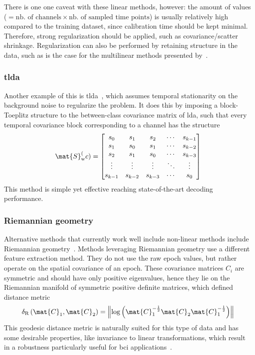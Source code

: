 There is one one caveat with these linear methods, however:
the amount of values ($=\text{nb. of channels}\times\text{nb. of sampled time points}$)
is usually relatively high compared to the training dataset, since calibration
time should be kept minimal.
Therefore, strong regularization should be applied, such as covariance/scatter
shrinkage.
Regularization can also be performed by retaining structure in the data, such
as is the case for the multilinear methods presented by~\textcite{Lotte2018}.

\subsubsection{\Acf{tlda}}

Another example of this is \ac{tlda}~\cite{Sosulski2022}, which assumes temporal
stationarity on the background noise to regularize the problem.
It does this by imposing a block-Toeplitz structure to the between-class covariance
matrix of \ac{lda}, such that every temporal covariance block corresponding to
a channel has the structure
\begin{equation}
  \mat{S}_\text{w}^(c) = \begin{bmatrix}
s_0 & s_1 & s_2 & \cdots & s_{k-1} \\
s_1 & s_0 & s_1 & \cdots & s_{k-2} \\
s_2 & s_1 & s_0 & \cdots & s_{k-3} \\
\vdots & \vdots & \vdots & \ddots & \vdots \\
s_{k-1} & s_{k-2} & s_{k-3} & \cdots & s_0
\end{bmatrix}
\end{equation}
This method is simple yet effective reaching state-of-the-art decoding
performance.


\subsubsection{Riemannian geometry}

Alternative methods that currently work well include
non-linear methods include Riemannian geometry~\cite{Barachant2014}.
Methods leveraging Riemannian geometry use a different feature extraction
method.
They do not use the raw epoch values, but rather operate on the spatial
covariance of an epoch.
These covariance matrices $C_i$ are symmetric and should have only positive
eigenvalues, hence they lie on the Riemannian manifold of symmetric positive
definite matrices, which defined distance metric
\begin{equation}
  \delta_\text{R}\left(\mat{C}_1,\mat{C}_2\right)
  =\left\lVert\log\left(\mat{C}_1^{-\frac{1}{2}} \mat{C}_2 \mat{C}_1^{-\frac{1}{2}}\right)\right\rVert
\end{equation}
This geodesic distance metric is naturally suited for this type of data and has
some desirable properties, like invariance to linear transformations, which
result in a robustness particularly useful for \ac{bci}
applications~\cite{Barachant2011}.

